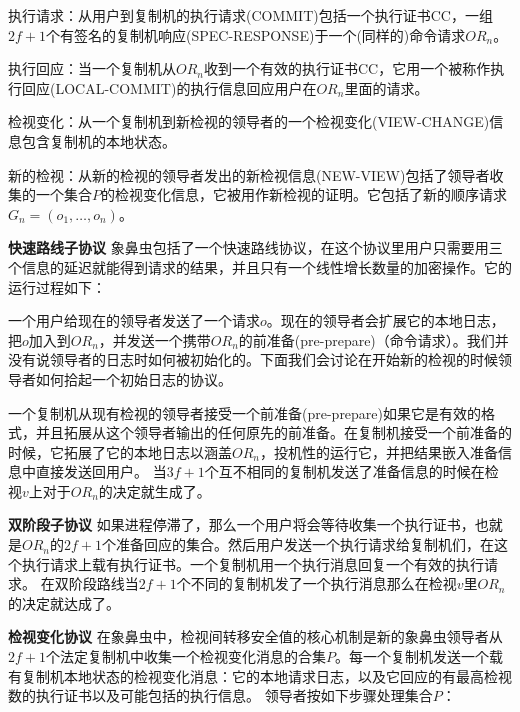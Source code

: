 \documentclass[UTF8]{ctexart}
\begin{document}
执行请求：从用户到复制机的执行请求(COMMIT)包括一个执行证书CC，一组$2f + 1$个有签名的复制机响应(SPEC-RESPONSE)于一个(同样的)命令请求$OR_n$。

执行回应：当一个复制机从$OR_n$收到一个有效的执行证书CC，它用一个被称作执行回应(LOCAL-COMMIT)的执行信息回应用户在$OR_n$里面的请求。

检视变化：从一个复制机到新检视的领导者的一个检视变化(VIEW-CHANGE)信息包含复制机的本地状态。

新的检视：从新的检视的领导者发出的新检视信息(NEW-VIEW)包括了领导者收集的一个集合$P$的检视变化信息，它被用作新检视的证明。它包括了新的顺序请求$G_n = (o_1, \ldots, o_n)$。

\vspace{3mm}

\textbf{快速路线子协议} \hspace{3mm} 象鼻虫包括了一个快速路线协议，在这个协议里用户只需要用三个信息的延迟就能得到请求的结果，并且只有一个线性增长数量的加密操作。它的运行过程如下：

一个用户给现在的领导者发送了一个请求$o$。现在的领导者会扩展它的本地日志，把$o$加入到$OR_n$，并发送一个携带$OR_n$的前准备(pre-prepare)（命令请求）。我们并没有说领导者的日志时如何被初始化的。下面我们会讨论在开始新的检视的时候领导者如何拾起一个初始日志的协议。

一个复制机从现有检视的领导者接受一个前准备(pre-prepare)如果它是有效的格式，并且拓展从这个领导者输出的任何原先的前准备。在复制机接受一个前准备的时候，它拓展了它的本地日志以涵盖$OR_n$，投机性的运行它，并把结果嵌入准备信息中直接发送回用户。
当$3f + 1$个互不相同的复制机发送了准备信息的时候在检视$v$上对于$OR_n$的决定就生成了。

\vspace{3mm}

\textbf{双阶段子协议} \hspace{3mm} 如果进程停滞了，那么一个用户将会等待收集一个执行证书，也就是$OR_n$的$2f + 1$个准备回应的集合。然后用户发送一个执行请求给复制机们，在这个执行请求上载有执行证书。一个复制机用一个执行消息回复一个有效的执行请求。
在双阶段路线当$2f + 1$个不同的复制机发了一个执行消息那么在检视$v$里$OR_n$的决定就达成了。

\vspace{3mm}

\textbf{检视变化协议} \hspace{3mm} 在象鼻虫中，检视间转移安全值的核心机制是新的象鼻虫领导者从$2f + 1$个法定复制机中收集一个检视变化消息的合集$P$。每一个复制机发送一个载有复制机本地状态的检视变化消息：它的本地请求日志，以及它回应的有最高检视数的执行证书以及可能包括的执行信息。
领导者按如下步骤处理集合$P$：
\end{document}

